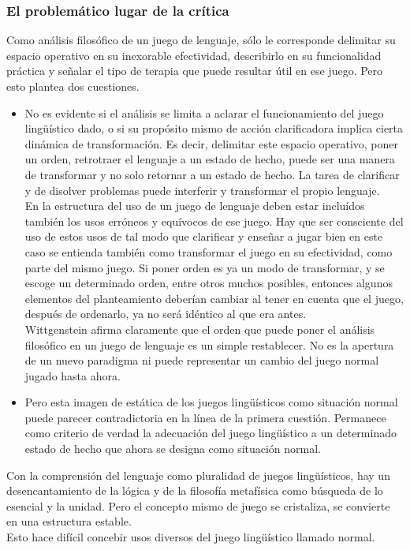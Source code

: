 \documentclass[a4paper, 11pt, twocolumn, spanish]{article}
\begin{document}
\subsubsection{El problemático lugar de la crítica}
\label{sec:org49d52a7}
Como análisis filosófico de un juego de lenguaje, sólo le corresponde
delimitar su espacio operativo en su inexorable efectividad,
describirlo en su funcionalidad práctica y señalar el tipo de terapia
que puede resultar útil en ese juego. Pero esto plantea dos cuestiones.
\begin{itemize}
\item No es evidente si el análisis se limita a aclarar el
funcionamiento del juego lingüístico dado, o si su propósito mismo
de acción clarificadora implica cierta dinámica de
transformación. Es decir, delimitar este espacio operativo, poner
un orden, retrotraer el lenguaje a un estado de hecho, puede ser
una manera de transformar y no solo retornar a un estado de
hecho. La tarea de clarificar y de disolver problemas puede
interferir y transformar el propio lenguaje.\\

En la estructura del uso de un juego de lenguaje deben estar
incluídos también los usos erróneos y equívocos de ese juego. Hay
que ser consciente del uso de estos usos de tal modo que
clarificar y enseñar a jugar bien en este caso se entienda también
como transformar el juego en su efectividad, como parte del mismo
juego. Si poner orden es ya un modo de transformar, y se escoge un
determinado orden, entre otros muchos posibles, entonces algunos
elementos del planteamiento deberían cambiar al tener en cuenta
que el juego, después de ordenarlo, ya no será idéntico al que era
antes.\\

Wittgenstein afirma claramente que el orden que puede poner el
análisis filosófico en un juego de lenguaje es un simple
restablecer. No es la apertura de un nuevo paradigma ni puede
representar un cambio del juego normal jugado hasta ahora.

\item Pero esta imagen de estática de los juegos lingüísticos como
situación normal puede parecer contradictoria en la línea de la
primera cuestión. Permanece como criterio de verdad la adecuación
del juego lingüístico a un determinado estado de hecho que ahora
se designa como situación normal.
\end{itemize}

Con la comprensión del lenguaje como pluralidad de juegos
lingüísticos, hay un desencantamiento de la lógica y de la filosofía
metafísica como búsqueda de lo esencial y la unidad. Pero el concepto
mismo de juego se cristaliza, se convierte en una estructura
estable. \\
Esto hace difícil concebir usos diversos del juego lingüístico llamado
normal.
\end{document}
